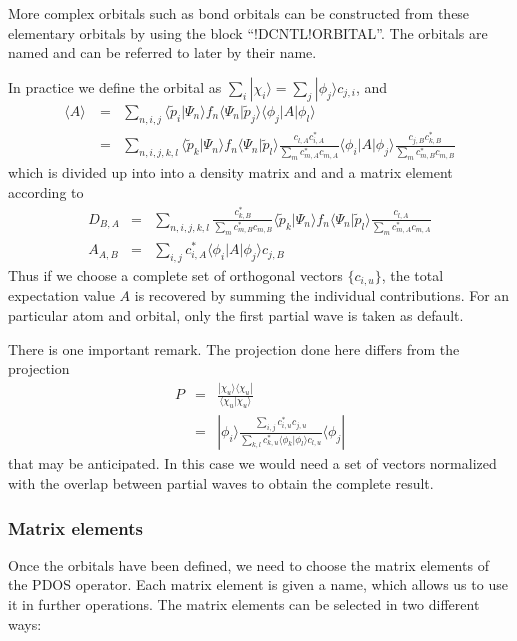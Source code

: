 \documentclass[final,12pt]{article}
\begin{document}
{More complex orbitals such as bond orbitals can be constructed from
these elementary orbitals by using the block ``!DCNTL!ORBITAL''. The
orbitals are named and can be referred to later by their name.

In practice we define the orbital as
$\sum_i|\chi_i\rangle=\sum_j|\phi_j\rangle c_{j,i}$, and
\begin{eqnarray*}
\langle A\rangle\
&=&\sum_{n,i,j}
\langle\tilde{p}_i|\Psi_n\rangle 
f_n\langle\Psi_n|\tilde{p}_j\rangle\langle\phi_j|A|\phi_l\rangle
\\
&=&\sum_{n,i,j,k,l}
\langle\tilde{p}_k|\Psi_n\rangle 
f_n\langle\Psi_n|\tilde{p}_l\rangle
\frac{c_{l,A}c^*_{i,A}}{\sum_m c^*_{m,A}c_{m,A}}
\langle\phi_i|A|\phi_j\rangle
\frac{c_{j,B}c^*_{k,B}}{\sum_m c^*_{m,B}c_{m,B}}
\end{eqnarray*}
which is divided up into into a density matrix and and a matrix
element according to
\begin{eqnarray*}
D_{B,A}&=&\sum_{n,i,j,k,l}
\frac{c^*_{k,B}}{\sum_m c^*_{m,B}c_{m,B}}
\langle\tilde{p}_k|\Psi_n\rangle 
f_n\langle\Psi_n|\tilde{p}_l\rangle
\frac{c_{l,A}}{\sum_m c^*_{m,A}c_{m,A}}
\\
A_{A,B}&=&\sum_{i,j}c^*_{i,A}\langle\phi_i|A|\phi_j\rangle c_{j,B}
\end{eqnarray*}
Thus if we choose a complete set of orthogonal vectors $\{c_{i,u}\}$,
the total expectation value $A$ is recovered by summing the individual
contributions. For an particular atom and orbital, only the first
partial wave is taken as default.

There is one important remark. The projection done here differs from
the projection 
\begin{eqnarray*}
P&=&\frac{|\chi_u\rangle\langle\chi_u|}{\langle\chi_u|\chi_u\rangle}
\\
&=&|\phi_i\rangle 
\frac{\sum_{i,j} c^*_{i,u}c_{j,u}}
{\sum_{k,l}c^*_{k,u}\langle\phi_k|\phi_l\rangle c_{l,u}}\langle\phi_j|
\end{eqnarray*}
that may be anticipated. In this case we would need a set of vectors
normalized with the overlap between partial waves to obtain the
complete result.


\subsubsection{Matrix elements}

Once the orbitals have been defined, we need to choose the matrix
elements of the PDOS operator. Each matrix element is given a name,
which allows us to use it in further operations. The matrix elements
can be selected in two different ways:

}
\end{document}
